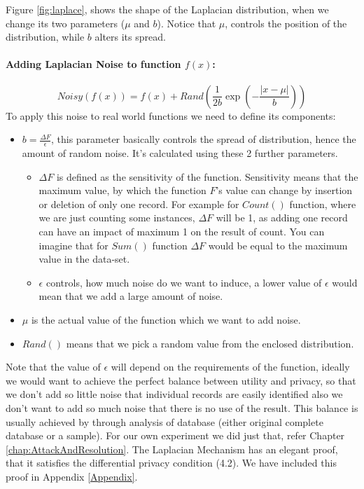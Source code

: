 \documentclass[12pt]{report}
\theoremstyle{named}
\begin{document}
Figure \ref{fig:laplace}, shows the shape of the Laplacian distribution, when we change its two parameters ($\mu$ and $b$). Notice that $\mu$, controls the position of the distribution, while $b$ alters its spread.

\paragraph{Adding Laplacian Noise to function $f(x)$:\\}
\begin{equation}
Noisy(f(x)) =f(x) + Rand( \frac{1}{2b} \exp(-\frac{\left | x-\mu  \right |}{b}))
\end{equation}
To apply this noise to real world functions we need to define its components:
\begin{itemize}
  \item $b = \frac{\Delta F}{\epsilon} $, this parameter basically controls the spread of distribution, hence the amount of random noise. It's calculated using these 2 further parameters.
  \begin{itemize}
  \item ${\Delta F}$ is defined as the sensitivity of the function. Sensitivity means that the maximum value, by which the function $F$'s value can change by insertion or deletion of only one record. For example for $Count()$ function, where we are just counting some instances, $\Delta F$ will be 1, as adding one record can have an impact of maximum 1 on the result of count. You can imagine that for $Sum()$ function $\Delta F$ would be equal to the maximum value in the data-set.
  \item ${\epsilon}$ controls, how much noise do we want to induce, a lower value of $\epsilon$ would mean that we add a large amount of noise.
  \end{itemize}
  \item $\mu$ is the actual value of the function which we want to add noise.
  \item  $Rand()$ means that we pick a random value from the enclosed distribution.
\end{itemize}

Note that the value of $\epsilon$ will depend on the requirements of the function, ideally we would want to achieve the perfect balance between utility and privacy, so that we don't add so little noise that individual records are easily identified also we don't want to add so much noise that there is no use of the result. This balance is usually achieved by through analysis of database (either original complete database or a sample). For our own experiment we did just that, refer Chapter \ref{chap:AttackAndResolution}.
The Laplacian Mechanism has an elegant proof, that it satisfies the differential privacy condition (4.2). We have included this proof in Appendix \ref{Appendix}.
\end{document}
